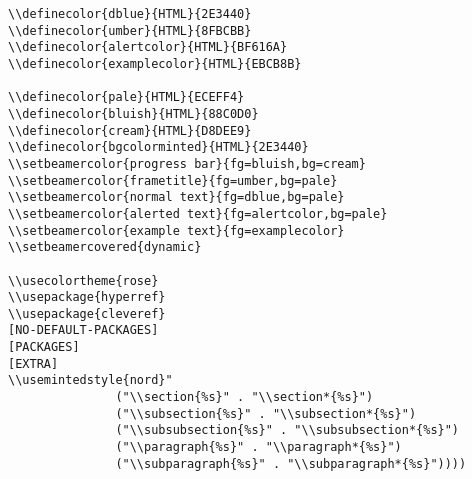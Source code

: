 \documentclass[c]{article}
\theoremstyle{plain}%
\theoremstyle{definition}
\theoremstyle{remark}
\begin{document}
\begin{verbatim}
\\definecolor{dblue}{HTML}{2E3440}
\\definecolor{umber}{HTML}{8FBCBB}
\\definecolor{alertcolor}{HTML}{BF616A}
\\definecolor{examplecolor}{HTML}{EBCB8B}

\\definecolor{pale}{HTML}{ECEFF4}
\\definecolor{bluish}{HTML}{88C0D0}
\\definecolor{cream}{HTML}{D8DEE9}
\\definecolor{bgcolorminted}{HTML}{2E3440}
\\setbeamercolor{progress bar}{fg=bluish,bg=cream}
\\setbeamercolor{frametitle}{fg=umber,bg=pale}
\\setbeamercolor{normal text}{fg=dblue,bg=pale}
\\setbeamercolor{alerted text}{fg=alertcolor,bg=pale}
\\setbeamercolor{example text}{fg=examplecolor}
\\setbeamercovered{dynamic}

\\usecolortheme{rose}
\\usepackage{hyperref}
\\usepackage{cleveref}
[NO-DEFAULT-PACKAGES]
[PACKAGES]
[EXTRA]
\\usemintedstyle{nord}"
               ("\\section{%s}" . "\\section*{%s}")
               ("\\subsection{%s}" . "\\subsection*{%s}")
               ("\\subsubsection{%s}" . "\\subsubsection*{%s}")
               ("\\paragraph{%s}" . "\\paragraph*{%s}")
               ("\\subparagraph{%s}" . "\\subparagraph*{%s}"))))
\end{verbatim}
\end{document}
